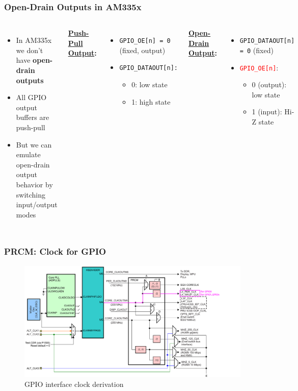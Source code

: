 \documentclass[aspectratio=169,usenames,dvipsnames]{beamer}
\begin{document}
\begin{frame}
  \frametitle{Open-Drain Outputs in AM335x}
  \begin{columns}
      \begin{itemize}
        \item In AM335x we don't have \textbf{open-drain outputs}
        \item All GPIO output buffers are push-pull
        \item But we can emulate open-drain output behavior by
              \alert{switching input/output modes}
      \end{itemize}
      \textbf{\underline{Push-Pull Output}:}
      \begin{itemize}
        \item \texttt{GPIO\_OE[n] = 0} (fixed, output)
        \item \texttt{GPIO\_DATAOUT[n]:}
        \begin{itemize}
          \item 0: low state
          \item 1: high state
        \end{itemize}
      \end{itemize}
      \textbf{\underline{Open-Drain Output}:}
      \begin{itemize}
        \item \texttt{GPIO\_DATAOUT[n] = 0} (fixed)
        \item \texttt{\textcolor{red}{GPIO\_OE[n]}}:
        \begin{itemize}
          \item 0 (output): low state
          \item 1 (input): Hi-Z state
        \end{itemize}
      \end{itemize}
  \end{columns}
\end{frame}

\begin{frame}
  \frametitle{PRCM: Clock for GPIO}
    \begin{figure}
      \centering
      \includegraphics[scale=0.3]{images/dpll-gpio.png}
      \caption{GPIO interface clock derivation}
  \end{figure}
  \vspace*{-12mm}
\end{frame}
\end{document}
